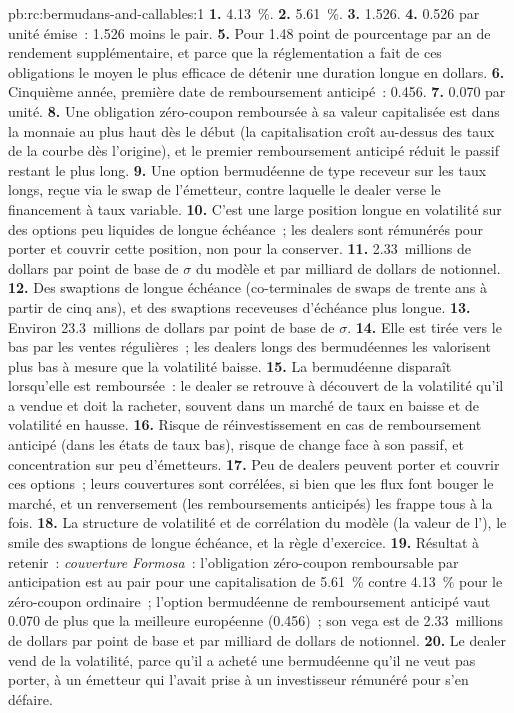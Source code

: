 \begin{solution}{pb:rc:bermudans-and-callables:1}
\textbf{1.} 4.13~\%.
\textbf{2.} 5.61~\%.
\textbf{3.} 1.526.
\textbf{4.} 0.526 par unité émise~: 1.526 moins le pair.
\textbf{5.} Pour 1.48 point de pourcentage par an de rendement supplémentaire, et parce que la
réglementation a fait de ces obligations le moyen le plus efficace de détenir une duration longue en dollars.
\textbf{6.} Cinquième année, première date de remboursement anticipé~: 0.456.
\textbf{7.} 0.070 par unité.
\textbf{8.} Une obligation zéro-coupon remboursée à sa valeur capitalisée est dans la monnaie au plus haut dès le début
(la capitalisation croît au-dessus des taux de la courbe dès l'origine), et le premier remboursement anticipé
réduit le passif restant le plus long.
\textbf{9.} Une option bermudéenne de type receveur sur les taux longs, reçue via le swap de l'émetteur, contre
laquelle le dealer verse le financement à taux variable.
\textbf{10.} C'est une large position longue en volatilité sur des options peu liquides de longue échéance~;
les dealers sont rémunérés pour porter et couvrir cette position, non pour la conserver.
\textbf{11.} 2.33~millions de dollars par point de base de $\sigma$ du modèle et par milliard de dollars de notionnel.
\textbf{12.} Des swaptions de longue échéance (co-terminales de swaps de trente ans à partir de cinq ans), et
des swaptions receveuses d'échéance plus longue.
\textbf{13.} Environ 23.3~millions de dollars par point de base de $\sigma$.
\textbf{14.} Elle est tirée vers le bas par les ventes régulières~; les dealers
longs des bermudéennes les valorisent plus bas à mesure que la volatilité baisse.
\textbf{15.} La bermudéenne disparaît lorsqu'elle est remboursée~: le dealer se retrouve à découvert
de la volatilité qu'il a vendue et doit la racheter, souvent dans un marché de taux en baisse et de volatilité
en hausse.
\textbf{16.} Risque de réinvestissement en cas de remboursement anticipé (dans les états de taux bas), risque de change face à son passif, et
concentration sur peu d'émetteurs.
\textbf{17.} Peu de dealers peuvent porter et couvrir ces options~; leurs couvertures sont corrélées, si bien que les flux
font bouger le marché, et un renversement (les remboursements anticipés) les frappe tous
à la fois.
\textbf{18.} La structure de volatilité et de corrélation du modèle (la valeur de l'), le smile
des swaptions de longue échéance, et la règle d'exercice.
\textbf{19.} Résultat à retenir~: \emph{couverture Formosa}~: l'obligation zéro-coupon remboursable par anticipation est au pair
pour une capitalisation de 5.61~\% contre 4.13~\% pour le zéro-coupon ordinaire~; l'option bermudéenne de remboursement anticipé
vaut 0.070 de plus que la meilleure européenne (0.456)~; son vega est de 2.33~millions de dollars par point de base
et par milliard de dollars de notionnel.
\textbf{20.} Le dealer vend de la volatilité, parce qu'il a acheté une bermudéenne qu'il ne veut pas
porter, à un émetteur qui l'avait prise à un investisseur rémunéré pour s'en défaire.
\end{solution}

